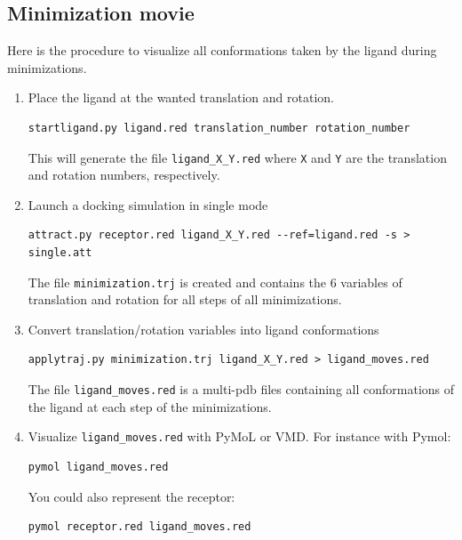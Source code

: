 \documentclass[12pt,a4paper]{article}
\begin{document}
\subsection{\label{video} Minimization movie}
Here is the procedure to visualize all conformations taken by the ligand during minimizations.

\begin{enumerate}
\item Place the ligand at the wanted translation and rotation.
\begin{verbatim}
startligand.py ligand.red translation_number rotation_number
\end{verbatim}
This will generate the file \verb=ligand_X_Y.red= where \verb=X= and \verb=Y= are the translation and rotation numbers, respectively.
\item Launch a docking simulation in single mode
\begin{verbatim}
attract.py receptor.red ligand_X_Y.red --ref=ligand.red -s > single.att
\end{verbatim}
The file \verb=minimization.trj= is created and contains the 6 variables of translation and rotation for all steps of all minimizations.
\item Convert translation/rotation variables into ligand conformations
\begin{verbatim}
applytraj.py minimization.trj ligand_X_Y.red > ligand_moves.red
\end{verbatim}
The file \verb=ligand_moves.red= is a multi-pdb files containing all conformations of the ligand at each step of the minimizations.
\item Visualize \verb=ligand_moves.red= with PyMoL or VMD. For instance with Pymol:
\begin{verbatim}
pymol ligand_moves.red
\end{verbatim}
You could also represent the receptor:
\begin{verbatim}
pymol receptor.red ligand_moves.red
\end{verbatim}
\end{enumerate}

{}

\end{document}

